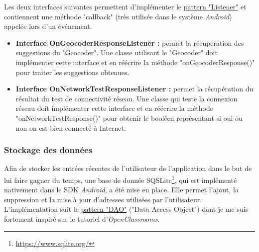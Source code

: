 Les deux interfaces suivantes permettent d'implémenter le \underline{pattern "Listener"} et contiennent une méthode "callback" (très utilisée dans le système \textit{Android}) appelée lors d'un événement.\\

\begin{itemize}
\item \textbf{Interface OnGeocoderResponseListener :} permet la récupération des suggestions du "Geocoder". Une classe utilisant le "Geocoder" doit implémenter cette interface et en réécrire la méthode "onGeocoderResponse()" pour traiter les suggestions obtenues. 
\item \textbf{Interface OnNetworkTestResponseListener :} permet la récupération du résultat du test de connectivité réseau. Une classe qui teste la connexion réseau doit implémenter cette interface et en réécrire la méthode "onNetworkTestResponse()" pour obtenir le booléen représentant si oui ou non on est bien connecté à Internet.
\end{itemize} 

\subsubsection{Stockage des données}

Afin de stocker les entrées récentes de l'utilisateur de l'application dans le but de lui faire gagner du temps, une base de donnée SQSLite\footnote{\url{https://www.sqlite.org/}}, qui est implémenté nativement dans le SDK \textit{Android}, a été mise en place. Elle permet l'ajout, la suppression et la mise à jour d'adresses utilisées par l'utilisateur. L'implémentation suit le \underline{pattern "DAO"} ("Data Access Object") dont je me suis fortement inspiré sur le tutoriel d'\textit{OpenClassrooms}\cite{BDD}.

